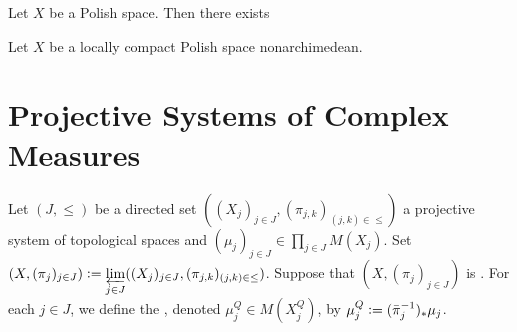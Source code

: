 \documentclass{book}
\begin{document}
\begin{ex}
	Let $X$ be a Polish space. Then there exists 
\end{ex}

\begin{ex}
	Let $X$ be a locally compact Polish space nonarchimedean. 
\end{ex}






























































\newpage
\section{Projective Systems of Complex Measures}

\begin{defn} 
	Let $(J, {\leq})$ be a directed set $((X_j)_{j \in J}, (\pi_{j,k})_{(j,k) \in \leq})$ a projective system of topological spaces and $(\mu_j)_{j \in J} \in \prod\limits_{j \in J} M(X_j)$. Set $(X, (\pi_j)_{j \in J}) \vcentcolon= \varprojlim\limits_{j \in J} ((X_j)_{j \in J}, (\pi_{j,k})_{(j,k) \in \leq})$. Suppose that $(X, (\pi_j)_{j \in J})$ is . For each $j \in J$, we define the , denoted $\mu^Q_j \in M(X^Q_j)$, by $\mu^Q_j \vcentcolon= (\bar{\pi}_j^{-1})_*\mu_j$. 
\end{defn}
\end{document}

